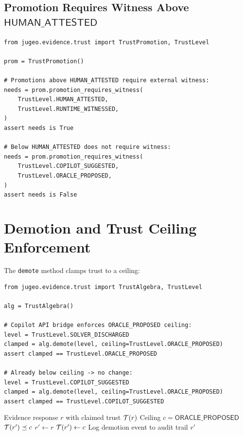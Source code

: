 \documentclass[11pt]{article}
\newcommand{\OracProp}{\mathsf{ORACLE\_PROPOSED}}
\newcommand{\HumAtt}{\mathsf{HUMAN\_ATTESTED}}
\begin{document}
\subsection{Promotion Requires Witness Above $\HumAtt$}

\begin{lstlisting}[style=jugeo-python]
from jugeo.evidence.trust import TrustPromotion, TrustLevel

prom = TrustPromotion()

# Promotions above HUMAN_ATTESTED require external witness:
needs = prom.promotion_requires_witness(
    TrustLevel.HUMAN_ATTESTED,
    TrustLevel.RUNTIME_WITNESSED,
)
assert needs is True

# Below HUMAN_ATTESTED does not require witness:
needs = prom.promotion_requires_witness(
    TrustLevel.COPILOT_SUGGESTED,
    TrustLevel.ORACLE_PROPOSED,
)
assert needs is False
\end{lstlisting}

\section{Demotion and Trust Ceiling Enforcement}\label{sec:demotion}

The \texttt{demote} method clamps trust to a ceiling:

\begin{lstlisting}[style=jugeo-python]
from jugeo.evidence.trust import TrustAlgebra, TrustLevel

alg = TrustAlgebra()

# Copilot API bridge enforces ORACLE_PROPOSED ceiling:
level = TrustLevel.SOLVER_DISCHARGED
clamped = alg.demote(level, ceiling=TrustLevel.ORACLE_PROPOSED)
assert clamped == TrustLevel.ORACLE_PROPOSED

# Already below ceiling -> no change:
level = TrustLevel.COPILOT_SUGGESTED
clamped = alg.demote(level, ceiling=TrustLevel.ORACLE_PROPOSED)
assert clamped == TrustLevel.COPILOT_SUGGESTED
\end{lstlisting}

\begin{algorithm}[h]
\caption{Trust Ceiling Enforcement for Copilot Evidence}
\label{alg:ceiling}
\begin{algorithmic}[1]
\REQUIRE Evidence response $r$ with claimed trust $\mathcal{T}(r)$
\REQUIRE Ceiling $c = \OracProp$
\ENSURE $\mathcal{T}(r') \preceq c$
\STATE $r' \gets r$
  \STATE $\mathcal{T}(r') \gets c$
  \STATE Log demotion event to audit trail
\ENDIF
\RETURN $r'$
\end{algorithmic}
\end{algorithm}
\end{document}
